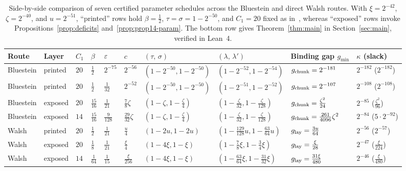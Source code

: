 \begin{table}[htbp]
\centering\footnotesize
\caption{Side-by-side comparison of seven certified parameter schedules across the Bluestein and direct Walsh routes. With $\xi=2^{-42}$, $\zeta=2^{-40}$, and $u=2^{-51}$, ``printed'' rows hold $\beta=\frac12$, $\tau=\sigma=1-2^{-50}$, and $C_1=20$ fixed as in~\cite[Prop.~14]{OAI26}, whereas ``exposed'' rows invoke Propositions~\ref{prop:deficits} and~\ref{prop:prop14-param}. The bottom row gives Theorem~\ref{thm:main} in Section~\ref{sec:main}, verified in Lean~4.}\label{tab:all-rows}
\setlength{\tabcolsep}{3.8pt}
\begin{tabular}{@{}llllllllll@{}}
\toprule
Route & Layer & $C_1$ & $\beta$ & $\varepsilon$ & $c$ & $(\tau,\,\sigma)$ & $(\lambda,\,\lambda')$ & Binding gap $g_{\min}$ & $\kappa$ (slack)\\
\midrule
Bluestein & printed & $20$ & $\frac12$ & $2^{-75}$ & $2^{-56}$ & $(1{-}2^{-50},1{-}2^{-50})$ & $(1{-}2^{-52},1{-}2^{-54})$ & $g_{\rm chunk}=2^{-181}$ & $2^{-182}$ ($2^{-182}$)\\
Bluestein & printed & $20$ & $\frac12$ & $\frac1{32}$ & $2^{-52}$ & $(1{-}2^{-50},1{-}2^{-50})$ & $(1{-}2^{-51},1{-}2^{-52})$ & $g_{\rm chunk}=2^{-107}$ & $2^{-108}$ ($2^{-108}$)\\
Bluestein & exposed & $20$ & $\frac{15}{16}$ & $\frac1{21}$ & $\frac78\zeta$ & $(1{-}\zeta,1{-}\frac\zeta4)$ & $(1{-}\frac\zeta{32},1{-}\frac\zeta{128})$ & $g_{\rm chunk}=\frac{\zeta^2}{24}$ & $2^{-85}$ ($\frac{\zeta^2}{96}$)\\
Bluestein & exposed & $14$ & $\frac{15}{16}$ & $\frac9{128}$ & $\frac{29}{32}\zeta$ & $(1{-}\zeta,1{-}\frac\zeta4)$ & $(1{-}\frac\zeta{32},1{-}\frac\zeta{128})$ & $g_{\rm chunk}=\frac{261}{4096}\zeta^2$ & $2^{-84}$ ($5{\cdot}2^{-92}$)\\
\midrule
Walsh & printed & $20$ & $\frac12$ & $\frac1{21}$ & $\frac u4$ & $(1{-}2u,1{-}2u)$ & $(1{-}\frac{129}{128}u,1{-}\frac{63}{64}u)$ & $g_{\rm lay}=\frac{3u}{64}$ & $2^{-56}$ ($2^{-57}$)\\
Walsh & exposed & $20$ & $\frac18$ & $\frac1{21}$ & $\frac\xi4$ & $(1{-}4\xi,1{-}\xi)$ & $(1{-}\frac78\xi,1{-}\frac34\xi)$ & $g_{\rm lay}=\frac\xi{28}$ & $2^{-47}$ ($\frac\xi{224}$)\\
Walsh & exposed & $14$ & $\frac1{64}$ & $\frac1{15}$ & $\frac\xi{256}$ & $(1{-}4\xi,1{-}\xi)$ & $(1{-}\frac{63}{64}\xi,1{-}\frac{31}{32}\xi)$ & $g_{\rm lay}=\frac{31\xi}{480}$ & $2^{-46}$ ($\frac\xi{480}$)\\
\bottomrule
\end{tabular}
\end{table}

